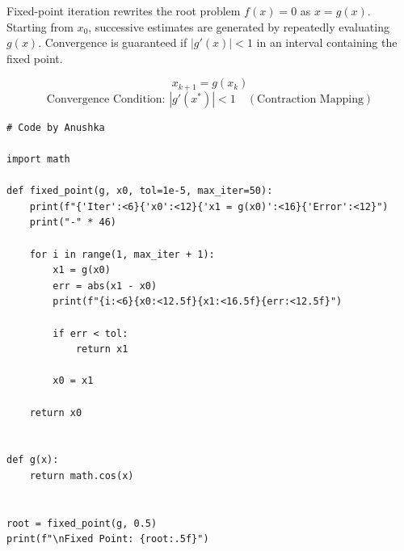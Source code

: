 \documentclass[10pt,a4paper]{report}
\begin{document}
Fixed-point iteration rewrites the root problem $f(x) = 0$ as $x = g(x)$. Starting from $x_0$, successive estimates are generated by repeatedly evaluating $g(x)$. Convergence is guaranteed if $|g'(x)| < 1$ in an interval containing the fixed point.

\begin{tcolorbox}[colback=theorybg,colframe=theoryframe,title=\textbf{Mathematical Theory \& Formulation},boxrule=1pt,arc=2mm]
\[
x_{k+1} = g(x_k)
\]
\[
\text{Convergence Condition: } |g'(x^*)| < 1 \quad (\text{Contraction Mapping})
\]
\end{tcolorbox}

\begin{tcolorbox}[colback=codebg,colframe=secondary,title=\textbf{Python Implementation (Step-by-Step Loops \& Pure Functions)},boxrule=1pt,arc=2mm]
\begin{lstlisting}[style=python_detailed]
# Code by Anushka

import math

def fixed_point(g, x0, tol=1e-5, max_iter=50):
    print(f"{'Iter':<6}{'x0':<12}{'x1 = g(x0)':<16}{'Error':<12}")
    print("-" * 46)

    for i in range(1, max_iter + 1):
        x1 = g(x0)
        err = abs(x1 - x0)
        print(f"{i:<6}{x0:<12.5f}{x1:<16.5f}{err:<12.5f}")

        if err < tol:
            return x1

        x0 = x1

    return x0


def g(x):
    return math.cos(x)


root = fixed_point(g, 0.5)
print(f"\nFixed Point: {root:.5f}")

\end{lstlisting}
\end{tcolorbox}
\end{document}

